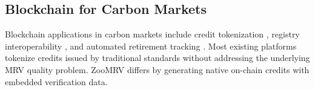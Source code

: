 \subsection{Blockchain for Carbon Markets}

Blockchain applications in carbon markets include credit tokenization
\citep{schletz2020blockchain}, registry interoperability
\citep{franke2020blockchain}, and automated retirement tracking
\citep{howson2019crypto}. Most existing platforms tokenize credits
issued by traditional standards without addressing the underlying MRV
quality problem. ZooMRV differs by generating native on-chain credits
with embedded verification data.


